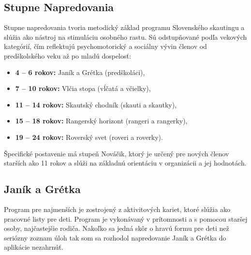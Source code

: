 \subsection{Stupne Napredovania}
Stupne napredovania tvoria metodický základ programu Slovenského skautingu a slúžia ako nástroj na stimuláciu osobného rastu. Sú odstupňované podľa vekových kategórií, čím reflektujú psychomotorický a sociálny vývin členov od predškolského veku až po mladú dospelosť:
\begin{itemize}
\item \textbf{4 – 6 rokov:} Janík a Grétka (predškoláci),
\item \textbf{7 – 10 rokov:} Vlčia stopa (vĺčatá a včielky),
\item \textbf{11 – 14 rokov:} Skautský chodník (skauti a skautky),
\item \textbf{15 – 18 rokov:} Rangerský horizont (rangeri a rangerky),
\item \textbf{19 – 24 rokov:} Roverský svet (roveri a roverky).
\end{itemize}
Špecifické postavenie má stupeň Nováčik, ktorý je určený pre nových členov starších ako 11 rokov a slúži na základnú orientáciu v organizácii a jej hodnotách. \cite{stupne_napredovania}

\subsection{Janík a Grétka}
Program pre najmenších je zostrojený z aktivitových kariet, ktoré slúžia ako pracovné listy pre deti. Program je vykonávaný v prítomnosti a s pomocou staršej osoby, najčastejšie rodiča. Nakoľko sa jedná skôr o hravú formu pre deti než seriózny zoznam úloh tak som sa rozhodol napredovanie Janík a Grétka do aplikácie nezahrnúť. \cite{janik_a_gretka}

